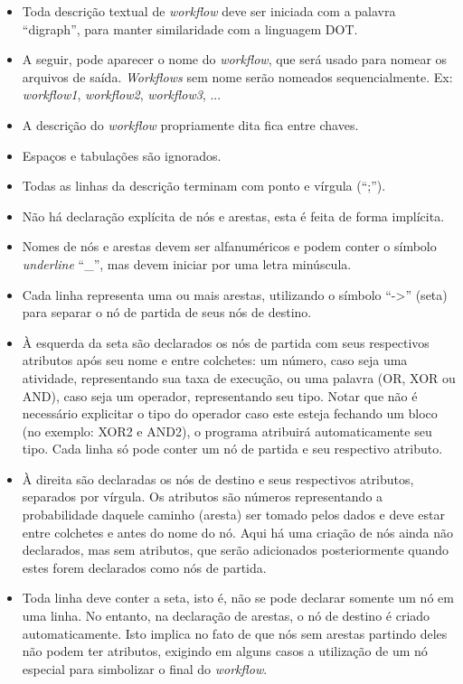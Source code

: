 \documentclass[a4paper,11pt]{article}
\begin{document}
  		\begin{itemize}
  			\item Toda descrição textual de \emph{workflow} deve ser iniciada com a palavra ``digraph'', para manter similaridade com a linguagem DOT.
  			\item A seguir, pode aparecer o nome do \emph{workflow}, que será usado para nomear os arquivos de saída. \emph{Workflows} sem nome serão nomeados sequencialmente. 
            Ex: \emph{workflow1}, \emph{workflow2}, \emph{workflow3}, ...
  			\item A descrição do \emph{workflow} propriamente dita fica entre chaves.
  			\item Espaços e tabulações são ignorados.
  			\item Todas as linhas da descrição terminam com ponto e vírgula (``;'').
  			\item Não há declaração explícita de nós e arestas, esta é feita de forma implícita.
  			\item Nomes de nós e arestas devem ser alfanuméricos e podem conter o símbolo \emph{underline} ``\_'', mas devem iniciar por uma letra min\'uscula.
  			\item Cada linha representa uma ou mais arestas, utilizando o símbolo ``->'' (seta) para separar o nó de partida de seus nós de destino.
  			\item À esquerda da seta são declarados os nós de partida com seus respectivos atributos após seu nome e entre colchetes: um número, caso seja uma atividade, representando sua taxa de execução, ou uma palavra (OR, XOR ou AND), caso seja um operador, representando seu tipo. Notar que não \'e necessário explicitar o tipo do operador caso este esteja fechando um bloco (no exemplo: XOR2 e AND2), o programa atribuir\'a automaticamente seu tipo. Cada linha só pode conter um nó de partida e seu respectivo atributo.
  			\item À direita são declaradas os nós de destino e seus respectivos atributos, separados por vírgula. Os atributos são números representando a probabilidade daquele caminho (aresta) ser tomado pelos dados e deve estar entre colchetes e antes do nome do nó. Aqui há uma criação de nós ainda não declarados, mas sem atributos, que serão adicionados posteriormente quando estes forem declarados como nós de partida.
  			\item Toda linha deve conter a seta, isto é, não se pode declarar somente um nó em uma linha. No entanto, na declaração de arestas, o nó de destino é criado automaticamente. Isto implica no fato de que nós sem arestas partindo deles não podem ter atributos, exigindo em alguns casos a utilização de um nó especial para simbolizar o final do \emph{workflow}.
  		\end{itemize}
\end{document}
